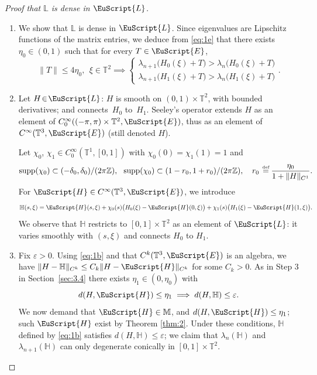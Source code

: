 \documentclass[10pt]{amsart}
\let\pazocal\EuScript
\theoremstyle{definition}
\newcommand{\supp}{\mathrm{supp}}
\newcommand{\EE}{\pazocal{E}}
\newcommand{\LL}{{\pazocal{L}}}
\newcommand{\HH}{\pazocal{H}}
\newcommand{\Hh}{{\mathbb{H}}}
\newcommand{\Ll}{\mathbb{L}}
\newcommand{\Mm}{\mathbb{M}}
\newcommand{\Z}{\mathbb{Z}}
\newcommand{\Tt}{{\mathbb{T}}}
\let\epsi\varepsilon
\newcommand{\systeme}[1]{\left\{ \begin{matrix} #1 \end{matrix}\right.}
\newcommand{\de}{\,\mathrel{\stackrel{\makebox[0pt]{\mbox{\normalfont\tiny def}}}{=}}}
\providecommand{\skpt}{\par\smallskip\noindent}
\begin{document}
\skpt
\begin{proof}[Proof that $\Ll$ is dense in $\LL$]
\begin{enumerate}
\item
We show that $\Ll$ is dense in $\LL$.
Since eigenvalues are Lipschitz functions of the matrix entries, we deduce from \eqref{eq:1e} that there exists $\eta_0 \in (0,1)$ such that for every $T \in \EE$,
\begin{equation}\label{eq:2a}
\| T \| \leq 4\eta_0, \ \ \xi \in \Tt^2 \implies \systeme{
\lambda_{n+1}\bigl(H_0(\xi)+T\bigr) > \lambda_n\bigl(H_0(\xi)+T\bigr)
\\[5pt]
\lambda_{n+1}\bigl(H_1(\xi)+T\bigr) > \lambda_n\bigl(H_1(\xi)+T\bigr)}.
\end{equation}

\item
Let $H\!\in\!\LL$: $H$ is smooth on $(0,1)\!\times\!\Tt^2$, with bounded derivatives; and connects~$H_0$ to~$H_1$. Seeley's operator \cite{S65} extends $H$ as an element of \hbox{$C_0^\infty((-\pi,\pi) \times \Tt^2,\EE)$}, thus as an element of $C^\infty(\Tt^3,\EE)$ (still denoted $H$).

Let $\chi_0$, $\chi_1 \in C_0^\infty(\Tt^1,[0,1])$ with $\chi_0(0) = \chi_1(1) = 1$ and
\begin{equation*}
\supp(\chi_0) \subset (-\delta_0,\delta_0)/(2\pi \Z), \ \ \supp(\chi_0) \subset (1-r_0,1+r_0)/(2\pi \Z), \quad r_0 \de \dfrac{\eta_0}{1+\| H \|_{C^1}}.
\end{equation*}
For $\HH \in C^\infty(\Tt^3,\EE)$, we introduce
\begin{equation}\label{eq:1b}
\Hh(s,\xi) = \HH(s,\xi) + \chi_0(s) \bigl( H_0(\xi) - \HH(0,\xi) \bigr) + \chi_1(s) \bigl( H_1(\xi) - \HH(1,\xi) \bigr).
\end{equation}
We observe that $\Hh$ restricts to $[0,1] \times \Tt^2$ as an element of $\LL$: it varies smoothly with $(s,\xi)$ and connects $H_0$ to $H_1$.

\item
Fix $\epsi > 0$. Using \eqref{eq:1b} and that $C^k(\Tt^3,\EE)$ is an algebra, we have $\| H -\Hh \|_{C^k} \leq C_k \| H -\HH \|_{C^k}$ for some $C_k > 0$. As in Step 3 in Section~\ref{sec:3.4} there exists $\eta_1 \in (0,\eta_0)$ with
\begin{equation*}
d(H,\HH) \leq \eta_1 \implies d(H,\Hh) \leq \epsi.
\end{equation*}
We now demand that $\HH \in \Mm$, and $d(H,\HH) \leq \eta_1$; such $\HH$ exist by Theorem \ref{thm:2}. Under these conditions, $\Hh$ defined by \eqref{eq:1b} satisfies $d(H,\Hh) \leq \epsi$; we claim that $\lambda_n(\Hh)$ and $\lambda_{n+1}(\Hh)$ can only degenerate conically in $[0,1] \times \Tt^2$.


\end{enumerate}
\end{proof}
\end{document}
